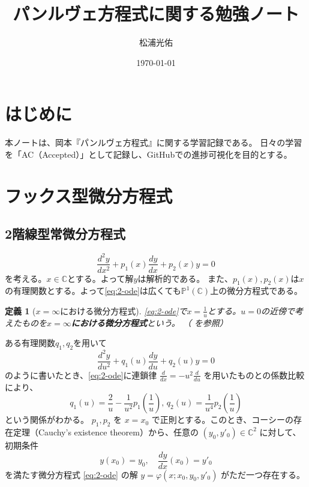 \documentclass[paper=a4, fontsize=11pt]{jlreq} %
\title{パンルヴェ方程式に関する勉強ノート}
\author{松浦光佑}
\date{\today}
\theoremstyle{break}
\newtheorem{definition}[theorem]{定義}
\theoremstyle{qa}
\theoremstyle{remark} %
\begin{document}
\maketitle
\tableofcontents %

\section{はじめに}
本ノートは、岡本『パンルヴェ方程式』に関する学習記録である。
日々の学習を「AC（Accepted）」として記録し、GitHubでの進捗可視化を目的とする。%

\section{フックス型微分方程式}

\subsection{2階線型常微分方程式}

\begin{equation}\label{eq:2-ode}
\frac{d^{2}y}{dx^{2}} + p_{1}(x)\frac{dy}{dx} + p_{2}(x)y = 0   
\end{equation}
を考える。$x\in\mathbb{C}$とする。よって解$y$は解析的である。
また、$p_{1}(x),p_{2}(x)$は$x$の有理関数とする。よって\eqref{eq:2-ode}は広くても$\mathbb{P}^{1}(\mathbb{C})$上の微分方程式である。
\begin{definition}[$x=\infty$における微分方程式]
    \eqref{eq:2-ode}で$x=\frac{1}{u}$とする。$u=0$の近傍で考えたものを\textbf{$x=\infty$における微分方程式}という。
    （\cite[p.49]{book:okamoto} を参照）
\end{definition}
ある有理関数$q_{1},q_{2}$を用いて
\[
\frac{d^{2}y}{du^{2}} + q_{1}(u)\frac{dy}{du} + q_{2}(u)y = 0
\]
のように書いたとき、\eqref{eq:2-ode}に連鎖律 $\frac{d}{dx} = -u^2 \frac{d}{du}$ を用いたものとの係数比較により、
\[
q_{1}(u) = \frac{2}{u}-\frac{1}{u^{2}}p_{1}\left(\frac{1}{u}\right),\, q_2(u)=\frac{1}{u^{4}}p_{2}\left(\frac{1}{u}\right)
\]
という関係がわかる。
$p_{1}, p_{2}$ を $x=x_{0}$ で正則とする。このとき、コーシーの存在定理（Cauchy's existence theorem）から、任意の $(y_{0}, y'_{0}) \in \mathbb{C}^{2}$ に対して、初期条件
$$
y(x_{0}) = y_{0}, \quad \frac{dy}{dx}(x_{0}) = y'_{0}
$$
を満たす微分方程式 \eqref{eq:2-ode} の解 $y = \varphi(x; x_{0}, y_{0}, y'_{0})$ がただ一つ存在する。
\end{document}
